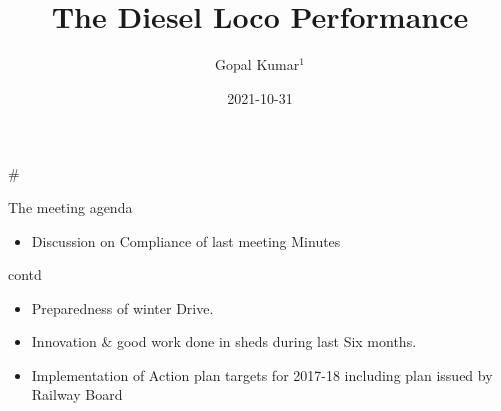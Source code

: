 \documentclass[
  ignorenonframetext,
]{beamer}
\title{The Diesel Loco Performance}
\author{Gopal Kumar\(^1\)}
\date{2021-10-31}
\institute{\(^1\)CMPE(Diesel)}
\providecommand{\tightlist}{%
  \setlength{\itemsep}{0pt}\setlength{\parskip}{0pt}}
\begin{document}
\frame{\titlepage}

\begin{frame}
\#
\end{frame}

\begin{frame}{The meeting agenda}
\protect\hypertarget{the-meeting-agenda}{}
\begin{itemize}[<+->]
\tightlist
\item
  Discussion on Compliance of last meeting Minutes
\end{itemize}

\begin{block}{contd}
\protect\hypertarget{contd}{}
\begin{itemize}[<+->]
\tightlist
\item
  Preparedness of winter Drive.
\item
  Innovation \& good work done in sheds during last Six months.
\item
  Implementation of Action plan targets for 2017-18 including plan
  issued by Railway Board
\end{itemize}
\end{block}
\end{frame}
\end{document}
